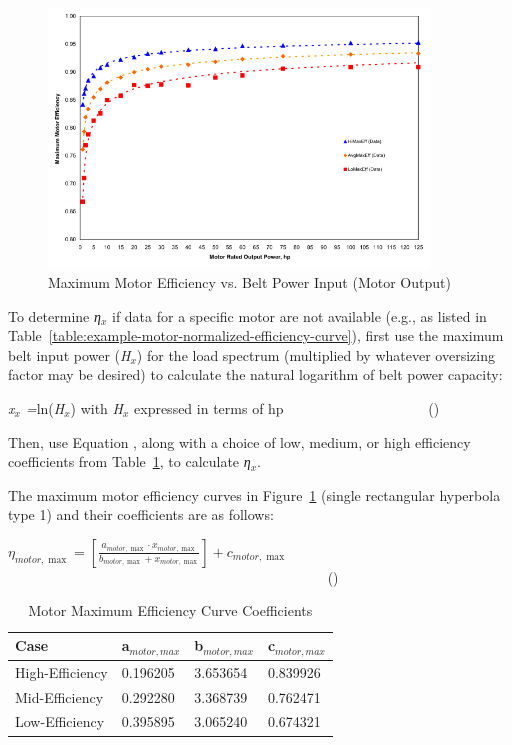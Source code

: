 \begin{figure}[hbtp] %
\centering
\includegraphics[width=0.9\textwidth, height=0.9\textheight, keepaspectratio=true]{media/image4917.svg.png}
\caption{Maximum Motor Efficiency vs. Belt Power Input (Motor Output) \protect \label{fig:maximum-motor-efficiency-vs.-belt-power-input}}
\end{figure}

To determine \emph{η\(_{x}\)} if data for a specific motor are not available (e.g., as listed in Table~\ref{table:example-motor-normalized-efficiency-curve}), first use the maximum belt input power (\emph{H\(_{x}\)}) for the load spectrum (multiplied by whatever oversizing factor may be desired) to calculate the natural logarithm of belt power capacity:

\emph{x\(_{x}\) =}ln(\emph{H\(_{x}\)}) with \emph{H\(_{x}\)} expressed in terms of hp~~~~~~~~~~~~~~~~~~~~ ()

Then, use Equation , along with a choice of low, medium, or high efficiency coefficients from Table~\ref{table:motor-maximum-efficiency-curve-coefficients}, to calculate \emph{η\(_{x}\)}.

The maximum motor efficiency curves in Figure~\ref{fig:maximum-motor-efficiency-vs.-belt-power-input} (single rectangular hyperbola type 1) and their coefficients are as follows:

\({\eta_{motor,\max }} = \left[ {\frac{{{a_{motor,\max }} \cdot {x_{motor,\max }}}}{{{b_{motor,\max }} + {x_{motor,\max }}}}} \right] + {c_{motor,\max }}\) ~~~~~~~~~~~~~~~~~~~~~~~~~~~~~~~~~~~~~~~~~~~~~ ()

\begin{longtable}[c]{@{}llll@{}}
\caption{Motor Maximum Efficiency Curve Coefficients \protect \label{table:motor-maximum-efficiency-curve-coefficients}}\\
\toprule 
Case & a\(_{motor,max}\) & b\(_{motor,max}\) & c\(_{motor,max}\) \tabularnewline \midrule
\endhead
High-Efficiency & 0.196205 & 3.653654 & 0.839926 \tabularnewline
Mid-Efficiency & 0.292280 & 3.368739 & 0.762471 \tabularnewline
Low-Efficiency & 0.395895 & 3.065240 & 0.674321 \tabularnewline
\bottomrule
\end{longtable}

